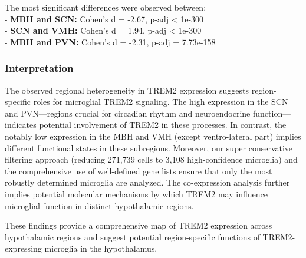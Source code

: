 \documentclass[
  letterpaper,
  DIV=11,
  numbers=noendperiod]{scrartcl}
\begin{document}
The most significant differences were observed between:\\
- \textbf{MBH and SCN:} Cohen's d = -2.67, p-adj \textless{} 1e-300\\
- \textbf{SCN and VMH:} Cohen's d = 1.94, p-adj \textless{} 1e-300\\
- \textbf{MBH and PVN:} Cohen's d = -2.31, p-adj = 7.73e-158

\subsubsection{Interpretation}\label{interpretation}

The observed regional heterogeneity in TREM2 expression suggests
region-specific roles for microglial TREM2 signaling. The high
expression in the SCN and PVN---regions crucial for circadian rhythm and
neuroendocrine function---indicates potential involvement of TREM2 in
these processes. In contrast, the notably low expression in the MBH and
VMH (except ventro-lateral part) implies different functional states in
these subregions. Moreover, our super conservative filtering approach
(reducing 271,739 cells to 3,108 high-confidence microglia) and the
comprehensive use of well-defined gene lists ensure that only the most
robustly determined microglia are analyzed. The co-expression analysis
further implies potential molecular mechanisms by which TREM2 may
influence microglial function in distinct hypothalamic regions.

These findings provide a comprehensive map of TREM2 expression across
hypothalamic regions and suggest potential region-specific functions of
TREM2-expressing microglia in the hypothalamus.
\end{document}
